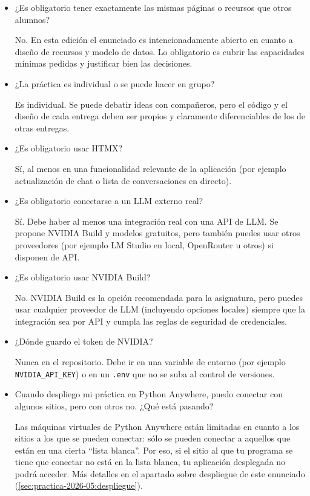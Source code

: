 \begin{itemize}

\item ¿Es obligatorio tener exactamente las mismas páginas o recursos que otros alumnos?

  No. En esta edición el enunciado es intencionadamente abierto en cuanto a diseño de recursos y modelo de datos. Lo obligatorio es cubrir las capacidades mínimas pedidas y justificar bien las decisiones.

\item ¿La práctica es individual o se puede hacer en grupo?

  Es individual. Se puede debatir ideas con compañeros, pero el código y el diseño de cada entrega deben ser propios y claramente diferenciables de los de otras entregas.
  
\item ¿Es obligatorio usar HTMX?

  Sí, al menos en una funcionalidad relevante de la aplicación (por ejemplo actualización de chat o lista de conversaciones en directo).

\item ¿Es obligatorio conectarse a un LLM externo real?

  Sí. Debe haber al menos una integración real con una API de LLM. Se propone NVIDIA Build y modelos gratuitos, pero también puedes usar otros proveedores (por ejemplo LM Studio en local, OpenRouter u otros) si disponen de API.

\item ¿Es obligatorio usar NVIDIA Build?

  No. NVIDIA Build es la opción recomendada para la asignatura, pero puedes usar cualquier proveedor de LLM (incluyendo opciones locales) siempre que la integración sea por API y cumpla las reglas de seguridad de credenciales.

\item ¿Dónde guardo el token de NVIDIA?

  Nunca en el repositorio. Debe ir en una variable de entorno (por ejemplo \verb|NVIDIA_API_KEY|) o en un \verb|.env| que no se suba al control de versiones.

\item Cuando despliego mi práctica en Python Anywhere, puedo conectar con algunos sitios, pero con otros no. ¿Qué está pasando?

  Las máquinas virtuales de Python Anywhere están limitadas en cuanto a los sitios a los que se pueden conectar: sólo se pueden conectar a aquellos que están en una cierta ``lista blanca''. Por eso, si el sitio al que tu programa se tiene que conectar no está en la lista blanca, tu aplicación desplegada no podrá acceder. Más detalles en el apartado sobre despliegue de este enunciado (\ref{sec:practica-2026-05:despliegue}).
  

\end{itemize}
